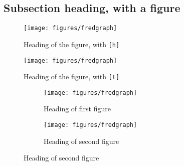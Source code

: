 \documentclass[12pt]{bppaper}
\begin{document}
\subsection{Subsection heading, with a figure}

\blindtext
\blindtext
\begin{figure}[h!]
\centering
\caption{Heading of the figure, with \texttt{[h]}}
\texttt{[image: figures/fredgraph]}
\end{figure}
\blindtext

\blindtext

\blindtext
\begin{figure}[t]
\centering
\caption{Heading of the figure, with \texttt{[t]}}
\texttt{[image: figures/fredgraph]}
\end{figure}
\blindtext


\blindtext
\begin{figure}[t]
\centering
\caption{Main heading of the figure, with \texttt{[t]}}
\begin{subfigure}{0.48\textwidth}
\caption{Heading of first figure}
\texttt{[image: figures/fredgraph]}
\end{subfigure}
\begin{subfigure}{0.48\textwidth}
\caption{Heading of second figure}
\texttt{[image: figures/fredgraph]}
\end{subfigure}
\end{figure}
\blindtext

\end{document}
